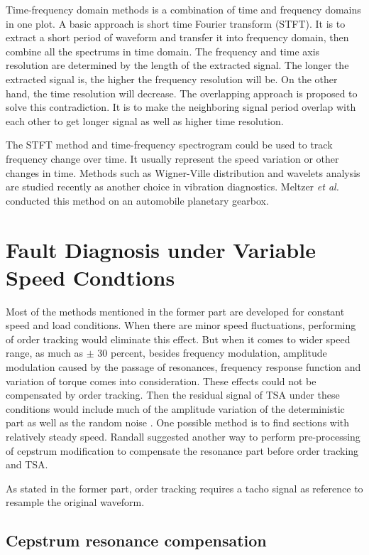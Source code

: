 Time-frequency domain methods is a combination of time and frequency domains in one plot. A basic approach is short time Fourier transform (STFT). It is to extract a short period of waveform and transfer it into frequency domain, then combine all the spectrums in time domain. The frequency and time axis resolution are determined by the length of the extracted signal. The longer the extracted signal is, the higher the frequency resolution will be. On the other hand, the time resolution will decrease. The overlapping approach is proposed to solve this contradiction. It is to make the neighboring signal period overlap with each other to get longer signal as well as higher time resolution.

The STFT method and time-frequency spectrogram could be used to track frequency change over time. It usually represent the speed variation or other changes in time. Methods such as Wigner-Ville distribution and wavelets analysis are studied recently as another choice in vibration diagnostics. Meltzer \textit{et al.} \cite{mel1} \cite{mel2} conducted this method on an automobile planetary gearbox.


\section{Fault Diagnosis under Variable Speed Condtions}

Most of the methods mentioned in the former part are developed for constant speed and load conditions. When there are minor speed fluctuations, performing of order tracking would eliminate this effect. But when it comes to wider speed range, as much as $\pm$ 30 percent, besides frequency modulation, amplitude modulation caused by the passage of resonances, frequency response function and variation of torque comes into consideration. These effects could not be compensated by order tracking. Then the residual signal of TSA under these conditions would include much of the amplitude variation of the deterministic part as well as the random noise \cite{varyspeed}. One possible method is to find sections with relatively steady speed. Randall \cite{varyspeed} suggested another way to perform pre-processing of cepstrum modification to compensate the resonance part before order tracking and TSA.

As stated in the former part, order tracking requires a tacho signal as reference to resample the original waveform. 

\subsection{Cepstrum resonance compensation}

